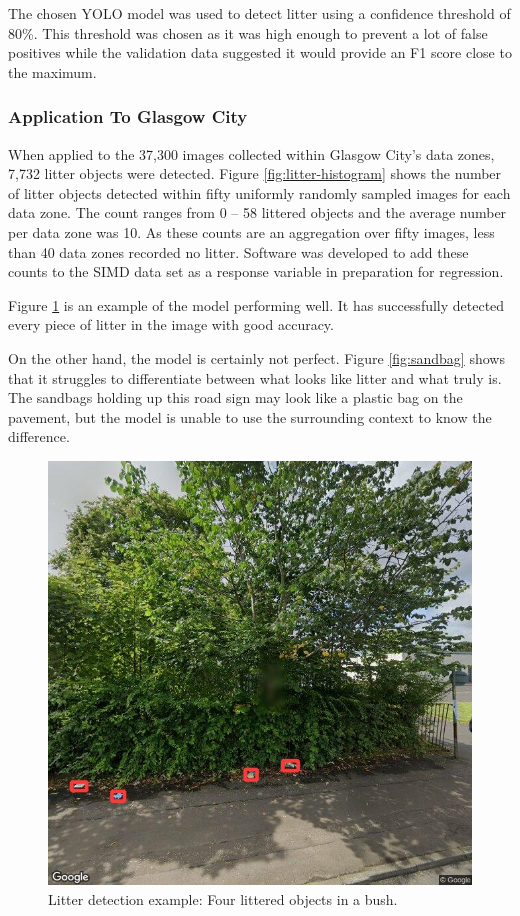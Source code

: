 \documentclass{thesis}
\begin{document}
The chosen YOLO model was used to detect litter using a confidence threshold of 80\%. This threshold was chosen as it was high enough to prevent a lot of false positives while the validation data suggested it would provide an F1 score close to the maximum.

\subsubsection{Application To Glasgow City}

When applied to the 37,300 images collected within Glasgow City's data zones, 7,732 litter objects were detected. Figure \ref{fig:litter-histogram} shows the number of litter objects detected within fifty uniformly randomly sampled images for each data zone. The count ranges from 0 -- 58 littered objects and the average number per data zone was 10. As these counts are an aggregation over fifty images, less than 40 data zones recorded no litter. Software was developed to add these counts to the SIMD data set as a response variable in preparation for regression.

Figure \ref{fig:4-in-bush} is an example of the model performing well. It has successfully detected every piece of litter in the image with good accuracy. 

On the other hand, the model is certainly not perfect. Figure \ref{fig:sandbag} shows that it struggles to differentiate between what looks like litter and what truly is. The sandbags holding up this road sign may look like a plastic bag on the pavement, but the model is unable to use the surrounding context to know the difference.

\newpage
{}
\begin{figure}[h!]
    \centering
    \includegraphics[scale=0.45]{images/good-4-in-bush.jpg}
    \caption{Litter detection example: Four littered objects in a bush.}
    \label{fig:4-in-bush}
\end{figure}
\end{document}
